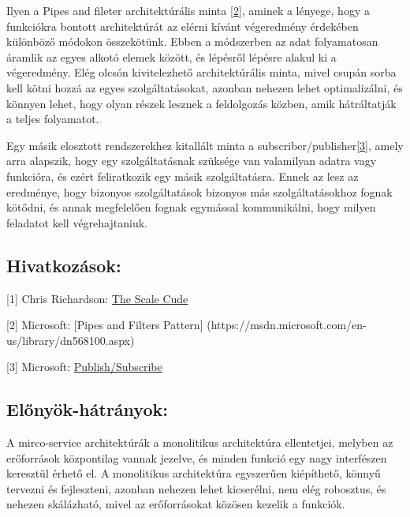 \documentclass[11pt,magyar,a4paper,oneside,]{report}
\begin{document}
Ilyen a Pipes and fileter architektúrális minta
\href{https://msdn.microsoft.com/en-us/library/dn568100.aspx}{{[}2{]}},
aminek a lényege, hogy a funkciókra bontott architektúrát az elérni
kívánt végeredmény érdekében különböző módokon összekötünk. Ebben a
módszerben az adat folyamatosan áramlik az egyes alkotó elemek között,
és lépésről lépésre alakul ki a végeredmény. Elég olcsón kivitelezhető
architektúrális minta, mivel csupán sorba kell kötni hozzá az egyes
szolgáltatásokat, azonban nehezen lehet optimalizálni, és könnyen lehet,
hogy olyan részek lesznek a feldolgozás közben, amik hátráltatják a
teljes folyamatot.

Egy másik elosztott rendszerekhez kitallált minta a
subscriber/publisher\href{https://msdn.microsoft.com/en-us/library/ff649664.aspx}{{[}3{]}},
amely arra alapszik, hogy egy szolgáltatásnak szüksége van valamilyan
adatra vagy funkcióra, és ezért feliratkozik egy másik szolgáltatásra.
Ennek az lesz az eredménye, hogy bizonyos szolgáltatások bizonyos más
szolgáltatásokhoz fognak kötődni, és annak megfelelően fognak egymással
kommunikálni, hogy milyen feladatot kell végrehajtaniuk.

\subsection{Hivatkozások:}\label{hivatkozuxe1sok}

{[}1{]} Chris Richardson:
\href{http://microservices.io/articles/scalecube.html}{The Scale Cude}

{[}2{]} Microsoft: {[}Pipes and Filters Pattern{]}
(https://msdn.microsoft.com/en-us/library/dn568100.aspx)

{[}3{]} Microsoft:
\href{https://msdn.microsoft.com/en-us/library/ff649664.aspx}{Publish/Subscribe}

\subsection{Előnyök-hátrányok:}\label{elux151nyuxf6k-huxe1truxe1nyok}

A mirco-service architektúrák a monolitikus architektúra ellentetjei,
melyben az erőforrások központilag vannak jezelve, és minden funkció egy
nagy interfészen keresztül érhető el. A monolitikus architektúra
egyszerűen kiépíthető, könnyű tervezni és fejleszteni, azonban nehezen
lehet kicserélni, nem elég robosztus, és nehezen skálázható, mivel az
erőforrásokat közösen kezelik a funkciók.
\end{document}
